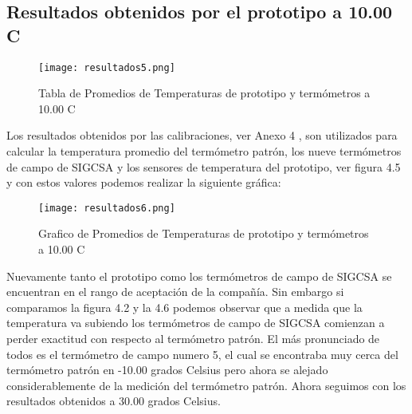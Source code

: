 \subsection{Resultados obtenidos por el prototipo a 10.00 C}

\begin{figure}[H]
	\centering
	\texttt{[image: resultados5.png]}
	\caption{Tabla de Promedios de Temperaturas de prototipo y termómetros a 10.00 C}
\end{figure}

\par \noindent 
Los resultados obtenidos por las calibraciones, ver Anexo 4 , son utilizados para calcular la temperatura promedio del termómetro patrón, los nueve termómetros de campo de SIGCSA y los sensores de temperatura del prototipo, ver figura 4.5 y con estos valores podemos realizar la siguiente gráfica:

\begin{figure}[H]
	\centering
	\texttt{[image: resultados6.png]}
	\caption{Grafico de Promedios de Temperaturas de prototipo y termómetros a 10.00 C}
\end{figure}

\par \noindent
Nuevamente tanto el prototipo como los termómetros de campo de SIGCSA se encuentran en el rango de aceptación de la compañía. Sin embargo si comparamos la figura 4.2 y la 4.6 podemos observar que a medida que la temperatura va subiendo los termómetros de campo de SIGCSA comienzan a perder exactitud con respecto al termómetro patrón. El más pronunciado de todos es el termómetro de campo numero 5, el cual se encontraba muy cerca del termómetro patrón en -10.00 grados Celsius pero ahora se alejado considerablemente de la medición del termómetro patrón. Ahora seguimos con los resultados obtenidos a 30.00 grados Celsius.

